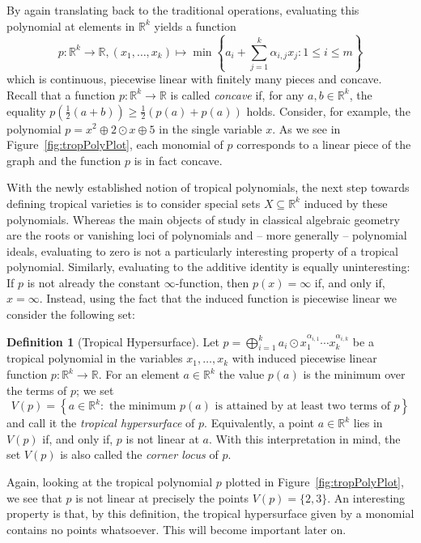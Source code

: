 \documentclass[
  paper=a4,
  titlepage,
  bibliography=totoc,
  pagesize=pdftex
]{scrartcl}
\numberwithin{figure}{section}
\numberwithin{equation}{section}
\numberwithin{table}{section}
\newcommand*\setR{\mathds{R}}
\theoremstyle{definition}
\newtheorem{definition}{Definition}
\numberwithin{definition}{section}
\begin{document}
By again translating back to the traditional operations, evaluating this polynomial at
elements in $\setR^k$ yields a function
\[
  p : \setR^k \to \setR, (x_1, \dots, x_k) \mapsto
  \min\left\{
    a_i + \sum_{j=1}^k \alpha_{i,j}x_j : 1 \leq i \leq m
  \right\}
\]
which is continuous, piecewise linear with finitely many pieces and concave. Recall that a
function $p:\setR^k\to\setR$ is called \emph{concave} if, for any $a,b \in \setR^k$, the
equality $p(\frac12(a+b)) \geq \frac12(p(a)+p(a))$ holds. Consider, for example, the
polynomial $p = x^2 \oplus 2\odot x \oplus 5$ in the single variable $x$. As we see in
Figure~\ref{fig:tropPolyPlot}, each monomial of $p$ corresponds to a linear piece of the
graph and the function $p$ is in fact concave.

With the newly established notion of tropical polynomials, the next step towards defining
tropical varieties is to consider special sets $X \subseteq \setR^k$ induced by these
polynomials. Whereas the main objects of study in classical algebraic geometry are the
roots or vanishing loci of polynomials and -- more generally -- polynomial ideals,
evaluating to zero is not a particularly interesting property of a tropical polynomial.
Similarly, evaluating to the additive identity is equally uninteresting: If $p$ is not
already the constant $\infty$-function, then $p(x)=\infty$ if, and only if, $x=\infty$.
Instead, using the fact that the induced function is piecewise linear we consider the
following set:

\begin{definition}[Tropical Hypersurface]
  \label{def:tropHypersurface}
  Let $p = \bigoplus_{i=1}^k a_i \odot x_1^{\alpha_{i,1}}\cdots x_k^{\alpha_{i,k}}$ be a
  tropical polynomial in the variables $x_1, \dots, x_k$ with induced piecewise linear
  function $p:\setR^k \to \setR$. For an element $a\in \setR^k$ the value $p(a)$ is the
  minimum over the terms of $p$; we set
  \[
    V(p) = \left\{
      a \in \setR^k :
      \text{ the minimum $p(a)$ is attained by at least two terms of $p$}
    \right\}
  \]
  and call it the \emph{tropical hypersurface} of $p$. Equivalently, a point $a\in
  \setR^k$ lies in $V(p)$ if, and only if, $p$ is not linear at $a$. With this
  interpretation in mind, the set $V(p)$ is also called the \emph{corner locus} of $p$.
\end{definition}

Again, looking at the tropical polynomial $p$ plotted in Figure~\ref{fig:tropPolyPlot}, we
see that $p$ is not linear at precisely the points $V(p) = \{ 2, 3 \}$. An interesting
property is that, by this definition, the tropical hypersurface given by a monomial
contains no points whatsoever. This will become important later on.
\end{document}
